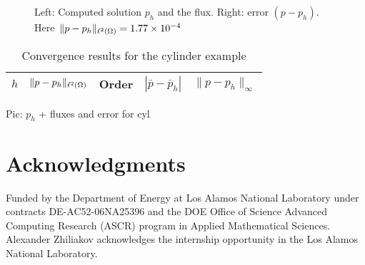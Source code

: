 \begin{figure}[H]
	\centering
	\begin{subfigure}[t]{.5\linewidth}
		\centering
	\end{subfigure}%
	\begin{subfigure}[t]{.5\linewidth}
		\centering
	\end{subfigure}%
	\caption{Left: Computed solution $p_h$ and the flux. Right: error $(p - p_h)$. Here~$\|p - p_h\|_{{\ell^2\left({\Omega}\right)}} = 1.77\times 10^{-4}$}
	\label{fig:cyl}		
\end{figure}

\begin{table}[H]
	\centering\footnotesize
	\caption{Convergence results for the cylinder example} 
	\label{tab:cyl}
	\begin{subtable}{1.\linewidth}
		\centering
		\begin{tabular}[1.2]{|c||c|c||c||c|}
			\hline
			$h$ & $\| p - p_h \|_{{\ell^2\left({\Omega}\right)}}$ & Order & $| \bar p - \bar p_h |$ & $\| p - p_h \|_{\infty}$ \\ 
			\hline
			
		\end{tabular}
	\end{subtable}%
\end{table}


Pic: $p_h$ + fluxes and error for cyl

\section*{Acknowledgments}

Funded by the Department of Energy at Los Alamos National Laboratory
under contracts DE-AC52-06NA25396 and the DOE Office of Science
Advanced Computing Research (ASCR) program in Applied Mathematical
Sciences. Alexander Zhiliakov acknowledges the internship opportunity in the Los Alamos National Laboratory.






